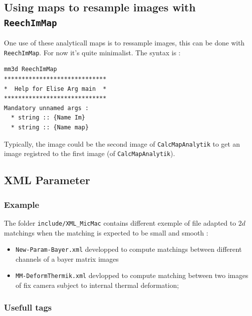 \subsection{Using maps to resample images with {\tt ReechImMap}}

One use of these analyticall maps is to ressample images,
this can be done with {\tt  ReechImMap}. For now it's quite minimalist. 
The syntax is :

\begin{verbatim}
mm3d ReechImMap
*****************************
*  Help for Elise Arg main  *
*****************************
Mandatory unnamed args : 
  * string :: {Name Im}
  * string :: {Name map}
\end{verbatim}

Typically, the image could be the second image of {\tt CalcMapAnalytik} 
to get an image registred to the first image (of {\tt CalcMapAnalytik}).



\subsection{XML Parameter}


\subsubsection{Example}

The folder {\tt include/XML\_MicMac} contains different exemple of file
adapted to $2d$ matchings when the matching is expected to be small and smooth :

\begin{itemize}
   \item {\tt New-Param-Bayer.xml} developped to compute matchings between 
         different channels of a bayer matrix images

   \item {\tt MM-DeformThermik.xml} devlopped to compute matching between
         two images of fix camera subject to internal thermal deformation;
\end{itemize}

\subsubsection{Usefull tags}

